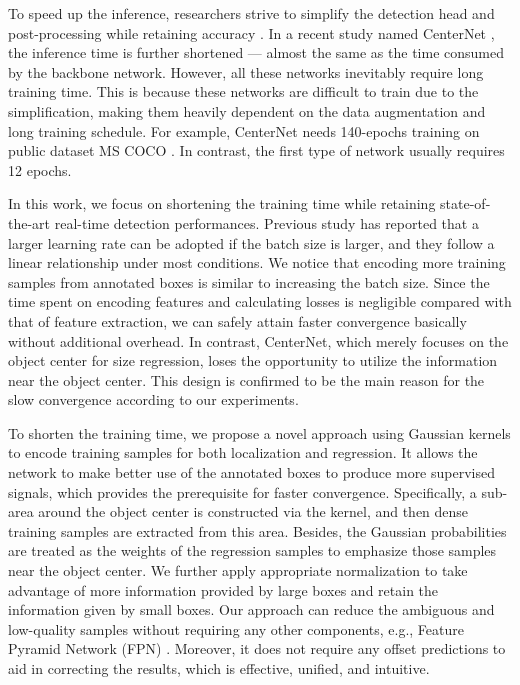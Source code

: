 \documentclass[letterpaper]{article} \usepackage{aaai20}  \usepackage{times}  \usepackage{helvet} \usepackage{courier}  \usepackage[hyphens]{url}  \usepackage{graphicx} \urlstyle{rm} \def\UrlFont{\rm}  \usepackage{graphicx}  \frenchspacing  \setlength{\pdfpagewidth}{8.5in}  \setlength{\pdfpageheight}{11in}  \usepackage{subcaption}
\begin{document}
To speed up the inference, researchers strive to simplify the detection head and post-processing while retaining accuracy \cite{liu2016ssd,redmon2018yolov3}. In a recent study named CenterNet \cite{DBLP:journals/corr/abs-1904-07850}, the inference time is further shortened --- almost the same as the time consumed by the backbone network. However, all these networks inevitably require long training time. This is because these networks are difficult to train due to the simplification, making them heavily dependent on the data augmentation and long training schedule. For example, CenterNet needs 140-epochs training on public dataset MS COCO \cite{lin2014microsoft}. In contrast, the first type of network usually requires 12 epochs.

In this work, we focus on shortening the training time while retaining state-of-the-art real-time detection performances. Previous study \cite{DBLP:journals/corr/GoyalDGNWKTJH17} has reported that a larger learning rate can be adopted if the batch size is larger, and they follow a linear relationship under most conditions. We notice that encoding more training samples from annotated boxes is similar to increasing the batch size. Since the time spent on encoding features and calculating losses is negligible compared with that of feature extraction, we can safely attain faster convergence basically without additional overhead. In contrast, CenterNet, which merely focuses on the object center for size regression, loses the opportunity to utilize the information near the object center. This design is confirmed to be the main reason for the slow convergence according to our experiments.

To shorten the training time, we propose a novel approach using Gaussian kernels to encode training samples for both localization and regression. It allows the network to make better use of the annotated boxes to produce more supervised signals, which provides the prerequisite for faster convergence. Specifically, a sub-area around the object center is constructed via the kernel, and then dense training samples are extracted from this area. Besides, the Gaussian probabilities are treated as the weights of the regression samples to emphasize those samples near the object center. We further apply appropriate normalization to take advantage of more information provided by large boxes and retain the information given by small boxes. Our approach can reduce the ambiguous and low-quality samples without requiring any other components, e.g., Feature Pyramid Network (FPN) \cite{lin2017feature}. Moreover, it does not require any offset predictions to aid in correcting the results, which is effective, unified, and intuitive.
\end{document}
